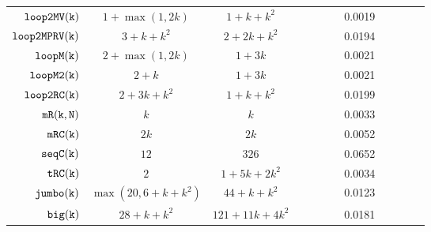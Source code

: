 {\begin {table}[H]
\begin{center}
{\begin{tabular}{ | >{\tiny}r | c | c | c | c | c | c | c | c | c | c | c |}
         $  \mathtt{loop2MV(k)}$  & $1 + \max(1,2k) $ &  $1 + k + k^2 $  & & & & & 0.0019 & & \\
         $ \mathtt{loop2MPRV(k)}$  &  $3 + k + k^2  $ &  $2 + 2k + k^2  $  &  & & & & 0.0194 & & \\
         {$ \mathtt{loopM(k)}$}  &  $ 2 + \max(1,2k) $ & $1 + 3k  $  &  & & & & 0.0021 & & \\
         {$ \mathtt{loopM2(k)}$}  &  $ 2 + k $ & $1 + 3k  $  &  & & & & 0.0021 & & \\
         {$\mathtt{loop2RC(k)}$}&  $2 + 3k + k^2$ &  $1 + k + k^2$  &  & & & & 0.0199 & & \\
         $  \mathtt{mR(k, N)}$ & $ k   $ & $k $   &  & & & & 0.0033 & & \\
         $  \mathtt{mRC(k)}$  & $  2k $ & $ 2k $   &  & & & & 0.0052 & & \\
         $  \mathtt{seqC(k)}$ & $12  $  & $326 $  &  & & & & 0.0652 & & \\
         $  \mathtt{tRC(k)}$ &  $ 2$ & $ 1 + 5k + 2 k^2 $  &  & & & & 0.0034 &  & \\
         $  \mathtt{{jumbo(k)}}$ & $  \max(20, 6+k+k^2)$   &   $ {44+k+k^2} $  &  & & & & 0.0123 &  & \\
         $  {\mathtt{big(k)}} $ &   $28 + k + k^2$ &  $121+11k+4k^2 $  &  & & & & 0.0181 & & \\
        \hline \hline 
        \end{tabular}
}
\end{center}
\end{table}
}


